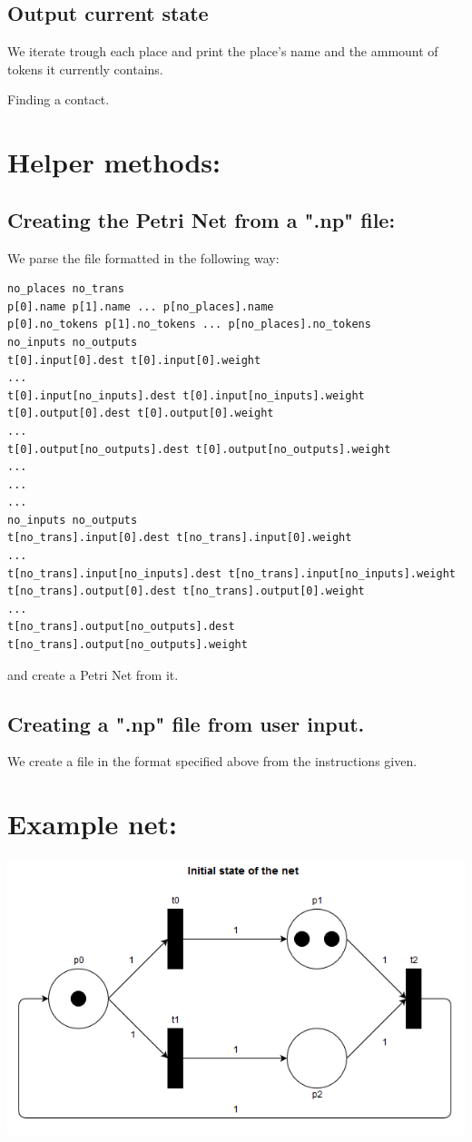 \documentclass[a4paper, 12pt]{article}
\begin{document}
\subsection*{Output current state}
We iterate trough each place and print the place's name and the ammount of tokens it currently contains.

\begin{algorithm}[H]
    \caption{Finding a contact.}
\end{algorithm}

\section*{Helper methods:}

\subsection*{Creating the Petri Net from a ".np" file:}
We parse the file formatted in the following way:

\begin{lstlisting}[basicstyle=\footnotesize]
no_places no_trans
p[0].name p[1].name ... p[no_places].name
p[0].no_tokens p[1].no_tokens ... p[no_places].no_tokens
no_inputs no_outputs
t[0].input[0].dest t[0].input[0].weight
...
t[0].input[no_inputs].dest t[0].input[no_inputs].weight
t[0].output[0].dest t[0].output[0].weight
...
t[0].output[no_outputs].dest t[0].output[no_outputs].weight
...
...
...
no_inputs no_outputs
t[no_trans].input[0].dest t[no_trans].input[0].weight
...
t[no_trans].input[no_inputs].dest t[no_trans].input[no_inputs].weight
t[no_trans].output[0].dest t[no_trans].output[0].weight
...
t[no_trans].output[no_outputs].dest t[no_trans].output[no_outputs].weight
\end{lstlisting}
and create a Petri Net from it.

\subsection*{Creating a ".np" file from user input.}
We create a file in the format specified above from the instructions given.

\section*{Example net:}
\includegraphics[scale=0.8]{init_state.png}
\end{document}
